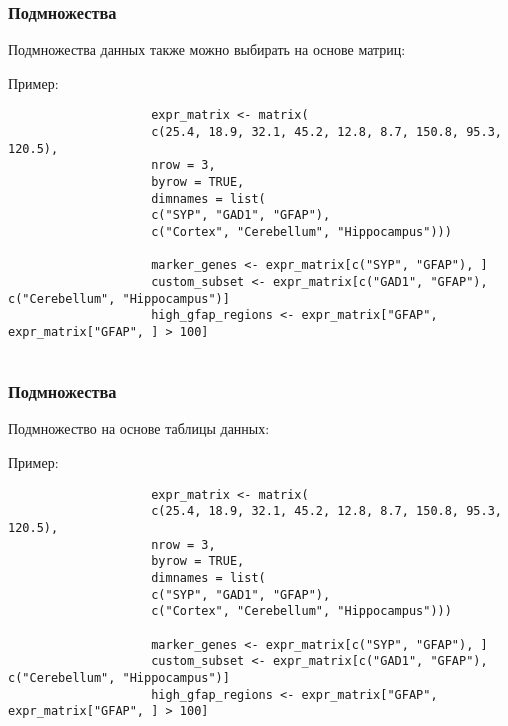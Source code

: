 \documentclass[10pt]{beamer}
\begin{document}
	\begin{frame}[fragile]
		\frametitle{Подмножества}
		Подмножества данных также можно выбирать на основе матриц:
		{\fontsize{8}{9}\selectfont
			\begin{exampleblock}{Пример:}
				\begin{verbatim}
					expr_matrix <- matrix(
					c(25.4, 18.9, 32.1, 45.2, 12.8, 8.7, 150.8, 95.3, 120.5), 
					nrow = 3,
					byrow = TRUE,
					dimnames = list(
					c("SYP", "GAD1", "GFAP"), 
					c("Cortex", "Cerebellum", "Hippocampus")))
					
					marker_genes <- expr_matrix[c("SYP", "GFAP"), ]
					custom_subset <- expr_matrix[c("GAD1", "GFAP"), c("Cerebellum", "Hippocampus")]
					high_gfap_regions <- expr_matrix["GFAP", expr_matrix["GFAP", ] > 100]          
					
				\end{verbatim}
			\end{exampleblock}
		}
		
		
	\end{frame}
	
	\begin{frame}[fragile]
		\frametitle{Подмножества}
		Подмножество на основе таблицы данных:
		{\fontsize{8}{9}\selectfont
			\begin{exampleblock}{Пример:}
				\begin{verbatim}
					expr_matrix <- matrix(
					c(25.4, 18.9, 32.1, 45.2, 12.8, 8.7, 150.8, 95.3, 120.5), 
					nrow = 3,
					byrow = TRUE,
					dimnames = list(
					c("SYP", "GAD1", "GFAP"), 
					c("Cortex", "Cerebellum", "Hippocampus")))
					
					marker_genes <- expr_matrix[c("SYP", "GFAP"), ]
					custom_subset <- expr_matrix[c("GAD1", "GFAP"), c("Cerebellum", "Hippocampus")]
					high_gfap_regions <- expr_matrix["GFAP", expr_matrix["GFAP", ] > 100]          
					
				\end{verbatim}
			\end{exampleblock}
		}
		
		
	\end{frame}
	
\end{document}
